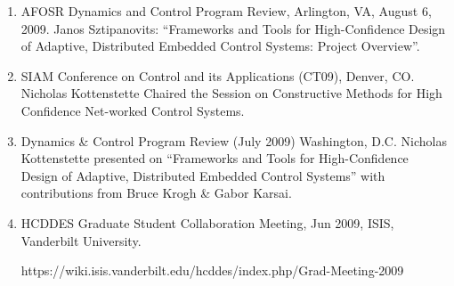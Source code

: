 \begin{enumerate}
\item AFOSR Dynamics and Control Program Review, Arlington, VA, August 6, 2009. Janos Sztipanovits: ``Frameworks and Tools for High-Confidence Design of Adaptive, Distributed Embedded Control Systems: Project Overview''.
\item SIAM Conference on Control and its Applications (CT09), Denver, CO. Nicholas Kottenstette Chaired the Session on Constructive Methods for High Confidence Net-worked Control Systems.
\item Dynamics \& Control Program Review (July 2009) Washington, D.C. Nicholas Kottenstette presented on ``Frameworks and Tools for High-Confidence Design of Adaptive, Distributed Embedded Control Systems'' with contributions from Bruce Krogh \& Gabor Karsai.
\item HCDDES Graduate Student Collaboration Meeting, Jun 2009, ISIS, Vanderbilt University. 

https://wiki.isis.vanderbilt.edu/hcddes/index.php/Grad-Meeting-2009


\end{enumerate}
